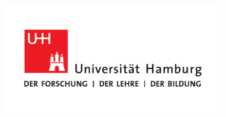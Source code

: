 
\begin{titlepage}

\setcounter{page}{-1}    

\begin{figure}[h]
    
    \begin{flushleft}
   
    \end{flushleft}
    \hspace{-40px}
    \noindent\begin{minipage}[t][0px][b]{0.3\textwidth}
    	\noindent\includegraphics[scale=0.3]{images/UHH-Logo_2010_Farbe_CMYK.pdf}
    \end{minipage}
    \hspace{50px}
    \begin{flushright}
    	  
    	 \begin{minipage}[t][-70px][b]{0.38\textwidth}
    	 	\begin{flushright}
    	 	\sffamily{
    	 	}
    	 \end{flushright}
    	 \end{minipage}
    	 \hspace{5px}
    	 \begin{minipage}[t][-47px][b]{0.14\textwidth}
    	 \end{minipage}
    \end{flushright}
    

\end{figure}
\end{titlepage}
